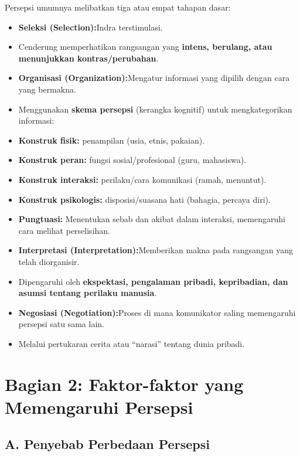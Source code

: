 \documentclass[
  letterpaper,
  DIV=11,
  numbers=noendperiod]{scrreprt}
\providecommand{\tightlist}{%
  \setlength{\itemsep}{0pt}\setlength{\parskip}{0pt}}
\begin{document}
Persepsi umumnya melibatkan tiga atau empat tahapan dasar:

\begin{itemize}
\tightlist
\item
  \textbf{Seleksi (Selection):}Indra terstimulasi.
\item
  Cenderung memperhatikan rangsangan yang \textbf{intens, berulang, atau
  menunjukkan kontras/perubahan}.
\item
  \textbf{Organisasi (Organization):}Mengatur informasi yang dipilih
  dengan cara yang bermakna.
\item
  Menggunakan \textbf{skema persepsi} (kerangka kognitif) untuk
  mengkategorikan informasi:
\item
  \textbf{Konstruk fisik:} penampilan (usia, etnis, pakaian).
\item
  \textbf{Konstruk peran:} fungsi sosial/profesional (guru, mahasiswa).
\item
  \textbf{Konstruk interaksi:} perilaku/cara komunikasi (ramah,
  menuntut).
\item
  \textbf{Konstruk psikologis:} disposisi/suasana hati (bahagia, percaya
  diri).
\item
  \textbf{Pungtuasi:} Menentukan sebab dan akibat dalam interaksi,
  memengaruhi cara melihat perselisihan.
\item
  \textbf{Interpretasi (Interpretation):}Memberikan makna pada
  rangsangan yang telah diorganisir.
\item
  Dipengaruhi oleh \textbf{ekspektasi, pengalaman pribadi, kepribadian,
  dan asumsi tentang perilaku manusia}.
\item
  \textbf{Negosiasi (Negotiation):}Proses di mana komunikator saling
  memengaruhi persepsi satu sama lain.
\item
  Melalui pertukaran cerita atau ``narasi'' tentang dunia pribadi.
\end{itemize}

\section{Bagian 2: Faktor-faktor yang Memengaruhi
Persepsi}\label{bagian-2-faktor-faktor-yang-memengaruhi-persepsi}

\subsection{A. Penyebab Perbedaan
Persepsi}\label{a.-penyebab-perbedaan-persepsi}
\end{document}
